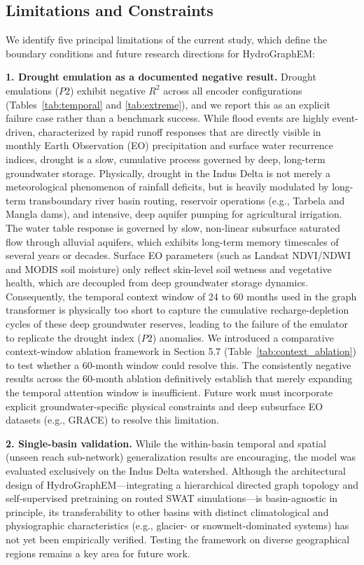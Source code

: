 \documentclass[preprint,12pt]{elsarticle}
\begin{document}
\subsection{Limitations and Constraints}\label{sec:limitations}
We identify five principal limitations of the current study, which define the boundary conditions and future research directions for HydroGraphEM:

\textbf{1. Drought emulation as a documented negative result.} Drought emulations ($P2$) exhibit negative $R^2$ across all encoder configurations (Tables~\ref{tab:temporal} and \ref{tab:extreme}), and we report this as an explicit failure case rather than a benchmark success. While flood events are highly event-driven, characterized by rapid runoff responses that are directly visible in monthly Earth Observation (EO) precipitation and surface water recurrence indices, drought is a slow, cumulative process governed by deep, long-term groundwater storage. Physically, drought in the Indus Delta is not merely a meteorological phenomenon of rainfall deficits, but is heavily modulated by long-term transboundary river basin routing, reservoir operations (e.g., Tarbela and Mangla dams), and intensive, deep aquifer pumping for agricultural irrigation. The water table response is governed by slow, non-linear subsurface saturated flow through alluvial aquifers, which exhibits long-term memory timescales of several years or decades. Surface EO parameters (such as Landsat NDVI/NDWI and MODIS soil moisture) only reflect skin-level soil wetness and vegetative health, which are decoupled from deep groundwater storage dynamics. Consequently, the temporal context window of 24 to 60 months used in the graph transformer is physically too short to capture the cumulative recharge-depletion cycles of these deep groundwater reserves, leading to the failure of the emulator to replicate the drought index ($P2$) anomalies. We introduced a comparative context-window ablation framework in Section 5.7 (Table~\ref{tab:context_ablation}) to test whether a 60-month window could resolve this. The consistently negative results across the 60-month ablation definitively establish that merely expanding the temporal attention window is insufficient. Future work must incorporate explicit groundwater-specific physical constraints and deep subsurface EO datasets (e.g., GRACE) to resolve this limitation.

\textbf{2. Single-basin validation.} While the within-basin temporal and spatial (unseen reach sub-network) generalization results are encouraging, the model was evaluated exclusively on the Indus Delta watershed. Although the architectural design of HydroGraphEM---integrating a hierarchical directed graph topology and self-supervised pretraining on routed SWAT simulations---is basin-agnostic in principle, its transferability to other basins with distinct climatological and physiographic characteristics (e.g., glacier- or snowmelt-dominated systems) has not yet been empirically verified. Testing the framework on diverse geographical regions remains a key area for future work.
\end{document}
